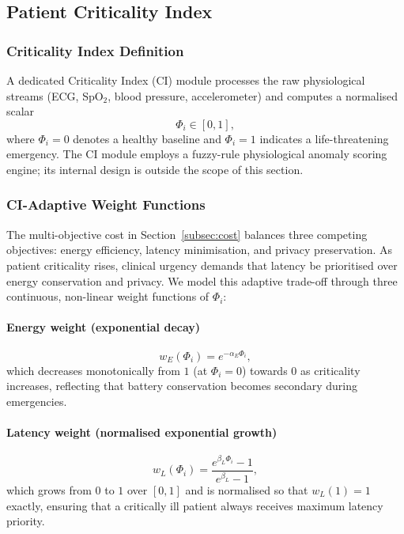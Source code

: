 \documentclass[journal,twoside,letterpaper]{IEEEtran}
\begin{document}
\subsection{Patient Criticality Index}
\label{subsec:criticality}

\subsubsection{Criticality Index Definition}

A dedicated Criticality Index (CI) module processes the raw physiological
streams (ECG, SpO$_2$, blood pressure, accelerometer) and computes a
normalised scalar
\begin{equation}
  \Phi_i \in [0, 1],
  \label{eq:ci_def}
\end{equation}
where $\Phi_i = 0$ denotes a healthy baseline and $\Phi_i = 1$ indicates
a life-threatening emergency.  The CI module employs a fuzzy-rule physiological
anomaly scoring engine; its internal design is outside the scope of this
section.

\subsubsection{CI-Adaptive Weight Functions}

The multi-objective cost in Section~\ref{subsec:cost} balances three competing
objectives: energy efficiency, latency minimisation, and privacy preservation.
As patient criticality rises, clinical urgency demands that latency be
prioritised over energy conservation and privacy.  We model this adaptive
trade-off through three continuous, non-linear weight functions of $\Phi_i$:

\paragraph{Energy weight (exponential decay)}
\begin{equation}
  w_E(\Phi_i) = e^{-\alpha_E \Phi_i},
  \label{eq:weight_energy}
\end{equation}
which decreases monotonically from $1$ (at $\Phi_i = 0$) towards $0$ as
criticality increases, reflecting that battery conservation becomes secondary
during emergencies.

\paragraph{Latency weight (normalised exponential growth)}
\begin{equation}
  w_L(\Phi_i) = \frac{e^{\beta_L \Phi_i} - 1}{e^{\beta_L} - 1},
  \label{eq:weight_latency}
\end{equation}
which grows from $0$ to $1$ over $[0,1]$ and is normalised so that
$w_L(1) = 1$ exactly, ensuring that a critically ill patient always
receives maximum latency priority.
\end{document}
